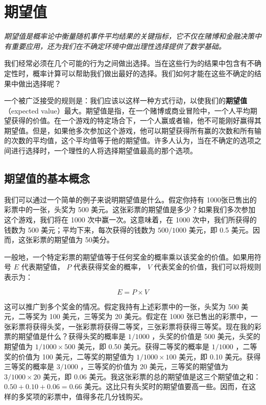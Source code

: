 \section{期望值}

\begin{logicbox}[title=引言]
\textit{期望值是概率论中衡量随机事件平均结果的关键指标，它不仅在赌博和金融决策中有重要应用，还为我们在不确定环境中做出理性选择提供了数学基础。}
\end{logicbox}

我们经常必须在几个可能的行为之间做出选择。当在这些行为的结果中包含有不确定性时，概率计算可以帮助我们做出最好的选择。我们如何才能在这些不确定的结果中做出选择呢？

一个被广泛接受的规则是：我们应该以这样一种方式行动，以使我们的\textbf{期望值}（expected value）最大。期望值是指，在一个赌博或商业冒险中，一个人平均期望获得的价值。在一个游戏的特定场合下，一个人赢或者输，他不可能刚好赢得其期望值。但是，如果他多次参加这个游戏，他可以期望获得所有赢的次数和所有输的次数的平均值，这个平均值等于他的期望值。许多人认为，当在不确定的选项之间进行选择时，一个理性的人将选择期望值最高的那个选项。

\subsection{期望值的基本概念}

我们可以通过一个简单的例子来说明期望值是什么。假定你持有 1000张已售出的彩票中的一张，头奖为 500 美元。这张彩票的期望值是多少？如果我们多次参加这个游戏，我们将在 1000 次中赢一次。这意味着，在 1000 次中，我们所获得的钱数为 500 美元；平均下来，每次获得的钱数为 $500 / 1000$ 美元，即 0.5 美元。因而，这张彩票的期望值为 50美分。

一般地，一个特定彩票的期望值等于任何奖金的概率乘以该奖金的价值。如果用符号 $E$ 代表期望值， $P$ 代表获得奖金的概率， $V$ 代表奖金的价值，我们可以将规则表示为：

$$
E=P \times V
$$

这可以推广到多个奖金的情况。假定我持有上述彩票中的一张，头奖为 500 美元，二等奖为 100 美元，三等奖为 20 美元。假定在 1000 张已售出的彩票中，一张彩票将获得头奖，一张彩票将获得二等奖，三张彩票将获得三等奖。现在我的彩票的期望值是什么？获得头奖的概率是 $1 / 1000$ ，头奖的价值是 500 美元，头奖的期望值为 $1 / 1000 \times 500$ 美元，即 0.50 美元。获得二等奖的概率是 $1 / 1000$ ，二等奖的价值为 100 美元，二等奖的期望值为 $1 / 1000 \times 100$ 美元，即 0.10 美元。获得三等奖的概率是 $3 / 1000$ ，三等奖的价值为 20 美元，三等奖的期望值为 $3 / 1000 \times 20$ 美元，即 0.06 美元。我这张彩票的总的期望值是这三个期望值之和： $0.50+0.10+0.06=0.66$ 美元。这比只有头奖时的期望值要高一些。因而，在这样的多奖项的彩票中，值得多花几分钱购买。

